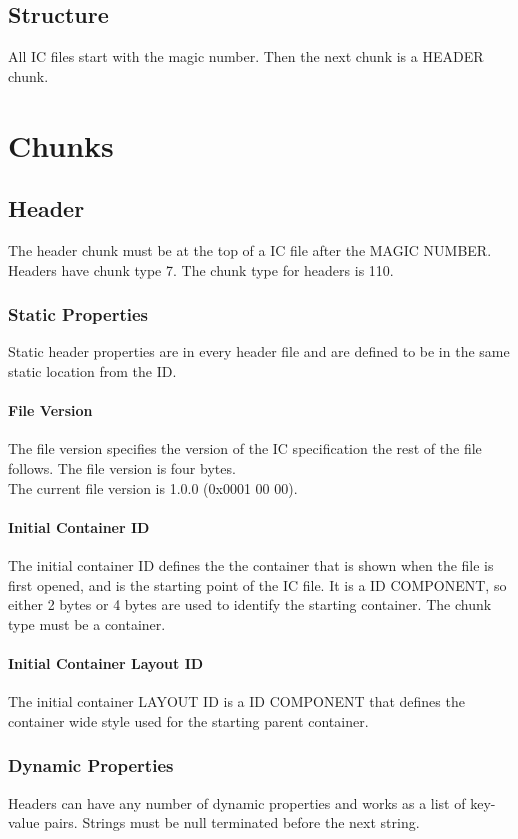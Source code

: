 \documentclass{report}
\begin{document}
\section{Structure}
All IC files start with the magic number. Then the next chunk is a HEADER chunk.
\chapter{Chunks}

\section{Header}
The header chunk must be at the top of a IC file after the MAGIC NUMBER. 
Headers have chunk type 7.
The chunk type for headers is 110. 

\subsection{Static Properties}
Static header properties are in every header file and are defined to be in the same static location from the ID. 

\subsubsection{File Version}
The file version specifies the version of the IC specification the rest of the file follows. The file version is four bytes.\\
The current file version is 1.0.0 (0x0001 00 00).

\subsubsection{Initial Container ID}
The initial container ID defines the the container that is shown when the file is first opened, and is the starting point of the IC file. It is a ID COMPONENT, so either 2 bytes or 4 bytes are used to identify the starting container. The chunk type must be a container.

\subsubsection{Initial Container Layout ID}
The initial container LAYOUT ID is a ID COMPONENT that defines the container wide style used for the starting parent container.

\subsection{Dynamic Properties}
Headers can have any number of dynamic properties and works as a list of key-value pairs. Strings must be null terminated before the next string.
\end{document}
